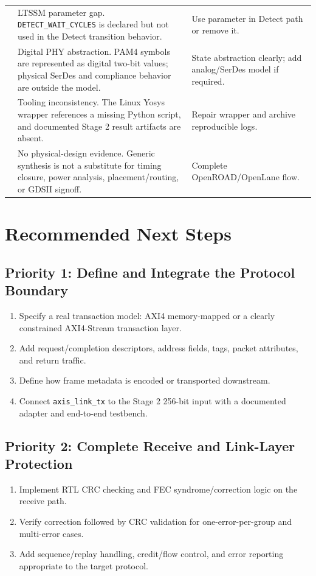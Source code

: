 \documentclass[11pt,a4paper]{article}
\newcommand{\code}[1]{\texttt{#1}}
\begin{document}
\begin{longtable}{>{\raggedright\arraybackslash}p{} >{\raggedright\arraybackslash}p{} >{\raggedright\arraybackslash}p{}}
9 & LTSSM parameter gap. \code{DETECT\_WAIT\_CYCLES} is declared but not used in the Detect transition behavior. & Use parameter in Detect path or remove it. \\
10 & Digital PHY abstraction. PAM4 symbols are represented as digital two-bit values; physical SerDes and compliance behavior are outside the model. & State abstraction clearly; add analog/SerDes model if required. \\
11 & Tooling inconsistency. The Linux Yosys wrapper references a missing Python script, and documented Stage 2 result artifacts are absent. & Repair wrapper and archive reproducible logs. \\
12 & No physical-design evidence. Generic synthesis is not a substitute for timing closure, power analysis, placement/routing, or GDSII signoff. & Complete OpenROAD/OpenLane flow. \\
\bottomrule
\end{longtable}

\section{Recommended Next Steps}

\subsection{Priority 1: Define and Integrate the Protocol Boundary}
\begin{enumerate}[leftmargin=*]
    \item Specify a real transaction model: AXI4 memory-mapped or a clearly constrained AXI4-Stream transaction layer.
    \item Add request/completion descriptors, address fields, tags, packet attributes, and return traffic.
    \item Define how frame metadata is encoded or transported downstream.
    \item Connect \code{axis\_link\_tx} to the Stage 2 256-bit input with a documented adapter and end-to-end testbench.
\end{enumerate}

\subsection{Priority 2: Complete Receive and Link-Layer Protection}
\begin{enumerate}[leftmargin=*]
    \item Implement RTL CRC checking and FEC syndrome/correction logic on the receive path.
    \item Verify correction followed by CRC validation for one-error-per-group and multi-error cases.
    \item Add sequence/replay handling, credit/flow control, and error reporting appropriate to the target protocol.
\end{enumerate}
\end{document}
